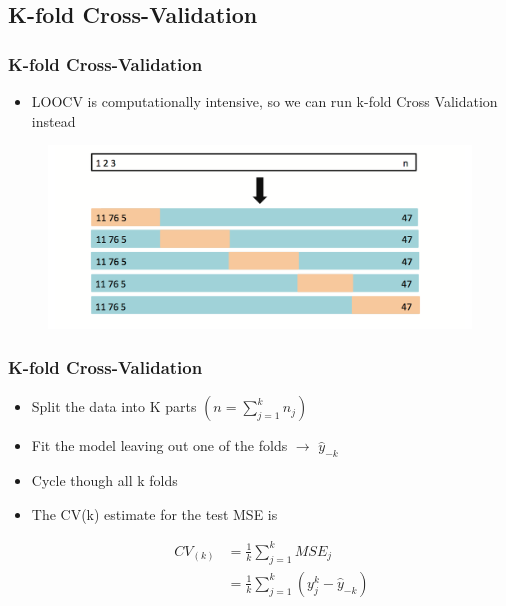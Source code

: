 \documentclass[
  shownotes,
  xcolor={svgnames},
  hyperref={colorlinks,citecolor=DarkBlue,linkcolor=DarkRed,urlcolor=DarkBlue}
  , aspectratio=169]{beamer}
\begin{document}
\subsection{K-fold Cross-Validation}
\begin{frame}[fragile]
\frametitle{K-fold Cross-Validation}
\begin{itemize}
\item LOOCV is computationally intensive, so we can run k-fold Cross Validation instead
\end{itemize}


 \begin{figure}[H] \centering
            \captionsetup{justification=centering}
              \includegraphics[scale=0.5]{figures/fig55.png}
       \end{figure}



\end{frame}
\begin{frame}[fragile]
\frametitle{K-fold Cross-Validation}

\begin{itemize}
  \item Split the data into K parts $(n=\sum_{j=1}^k n_j)$
  \medskip
  \item Fit the model leaving out one of the folds $\rightarrow$ $\hat{y}_{-k}$
  \medskip
  \item Cycle though all k folds
  \medskip
  \item The CV(k) estimate for the test MSE is


\begin{align}
CV_{(k)} &= \frac{1}{k}\sum_{j=1}^k MSE_j \\
         &= \frac{1}{k}\sum_{j=1}^k (y_j^k-\hat{y}_{-k})
\end{align}
\end{itemize}

\end{frame}
\end{document}

